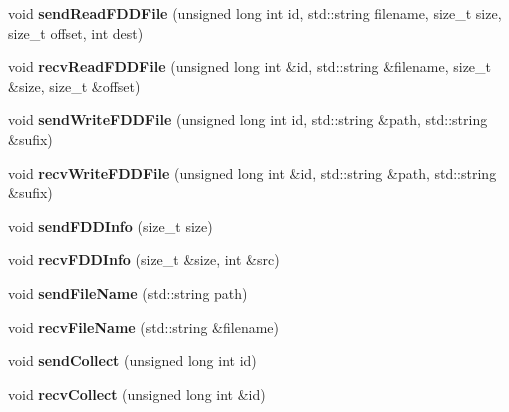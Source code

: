 \begin{DoxyCompactItemize}
void {\bfseries send\+Read\+F\+D\+D\+File} (unsigned long int id, std\+::string filename, size\+\_\+t size, size\+\_\+t offset, int dest)
\item 
\hypertarget{classfaster_1_1fastComm_aa6a698ffe5a0f0d37e6b3fb7b8c5d3c4}{}\label{classfaster_1_1fastComm_aa6a698ffe5a0f0d37e6b3fb7b8c5d3c4} 
void {\bfseries recv\+Read\+F\+D\+D\+File} (unsigned long int \&id, std\+::string \&filename, size\+\_\+t \&size, size\+\_\+t \&offset)
\item 
\hypertarget{classfaster_1_1fastComm_a8ccb090bf59c74033cbd48530c33d485}{}\label{classfaster_1_1fastComm_a8ccb090bf59c74033cbd48530c33d485} 
void {\bfseries send\+Write\+F\+D\+D\+File} (unsigned long int id, std\+::string \&path, std\+::string \&sufix)
\item 
\hypertarget{classfaster_1_1fastComm_a39577ef14e5c84b6b205f82c91c3700c}{}\label{classfaster_1_1fastComm_a39577ef14e5c84b6b205f82c91c3700c} 
void {\bfseries recv\+Write\+F\+D\+D\+File} (unsigned long int \&id, std\+::string \&path, std\+::string \&sufix)
\item 
\hypertarget{classfaster_1_1fastComm_a512e3c2324c15ba73df64f4607e0b064}{}\label{classfaster_1_1fastComm_a512e3c2324c15ba73df64f4607e0b064} 
void {\bfseries send\+F\+D\+D\+Info} (size\+\_\+t size)
\item 
\hypertarget{classfaster_1_1fastComm_aff3221fe657da542999b25ab17b7bc1b}{}\label{classfaster_1_1fastComm_aff3221fe657da542999b25ab17b7bc1b} 
void {\bfseries recv\+F\+D\+D\+Info} (size\+\_\+t \&size, int \&src)
\item 
\hypertarget{classfaster_1_1fastComm_a223bdb317bbccd9893e45ceba38b6ff4}{}\label{classfaster_1_1fastComm_a223bdb317bbccd9893e45ceba38b6ff4} 
void {\bfseries send\+File\+Name} (std\+::string path)
\item 
\hypertarget{classfaster_1_1fastComm_a9ea4e90af01c600cdc730172ba5dc168}{}\label{classfaster_1_1fastComm_a9ea4e90af01c600cdc730172ba5dc168} 
void {\bfseries recv\+File\+Name} (std\+::string \&filename)
\item 
\hypertarget{classfaster_1_1fastComm_a3cf9ee0da2560c2c14b4082defd43918}{}\label{classfaster_1_1fastComm_a3cf9ee0da2560c2c14b4082defd43918} 
void {\bfseries send\+Collect} (unsigned long int id)
\item 
\hypertarget{classfaster_1_1fastComm_abe93aedc98fe9f135befcba281d9255d}{}\label{classfaster_1_1fastComm_abe93aedc98fe9f135befcba281d9255d} 
void {\bfseries recv\+Collect} (unsigned long int \&id)
\item 
\hypertarget{classfaster_1_1fastComm_ae2e21e08b8a9812d8136d12e171fdbf6}{}\label{classfaster_1_1fastComm_ae2e21e08b8a9812d8136d12e171fdbf6} 

\end{DoxyCompactItemize}
